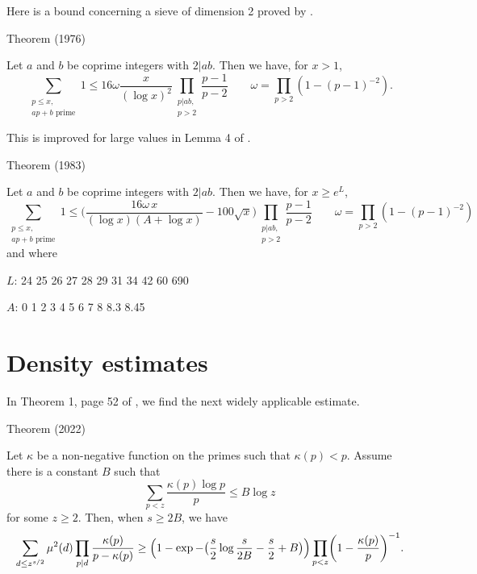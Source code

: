 \par 
Here is a bound concerning a sieve of dimension 2 proved by
\cite{Siebert*76}.
\par 
\begin{thm}{Theorem (1976)}

Let $a$ and $b$ be coprime integers with $2|ab$. Then we have, for $x>1$,
$$
\sum_{\substack{p\le x,\\ \text{$ap+b$ prime}}}1
\le 16 \omega\frac{x}{(\log x)^2}\prod_{\substack{p|ab,\\ p >
2}}\frac{p-1}{p-2}
\qquad \omega=\prod_{p > 2}(1-(p-1)^{-2}).
$$
\end{thm}


This is improved for large values in Lemma 4 of
\cite{Riesel-Vaughan*83}.
\par 
\begin{thm}{Theorem (1983)}

Let $a$ and $b$ be coprime integers with $2|ab$. Then we have, for $x
\ge e^L$,
$$
\sum_{\substack{p\le x,\\ \text{$ap+b$ prime}}}1
\le \biggl(\frac{16 \omega\, x}{(\log x)(A+\log x)}-100\sqrt{x}\biggr)\prod_{\substack{p|ab,\\ p >
2}}\frac{p-1}{p-2}
\qquad \omega=\prod_{p > 2}(1-(p-1)^{-2})
$$
and where

  
  
    
      $L$:
      24
      25
      26
      27
      28
      29
      31
      34
      42
      60
      690
    
    
      $A$:
      0
      1
      2
      3
      4
      5
      6
      7
      8
      8.3
      8.45
    
  
  
  
\end{thm}




\section{Density estimates }


In Theorem 1, page 52 of
\cite{Greaves*01},
we find the next widely applicable estimate.
\par 
\begin{thm}{Theorem (2022)}

    Let $\kappa$ be a non-negative function on the primes such that
    $\kappa(p) < p$. Assume there is a constant $B$ such that
		 $$
		 \sum_{p < z} \frac{\kappa(p)\log p}{p}
			   \le B\log z
			   $$
			   for some $z\ge 2$. Then, when $s\ge 2B$, we
			   have
			   $$
			   \sum_{d\le z^{s/2}}\mu^2(d)
			   \prod_{p|d}\frac{\kappa(p)}{p-\kappa(p)}
			   \ge
			   \Bigl(1-\exp-\bigl(\frac{s}{2}\log\frac{s}{2B}-\frac{s}{2}+B\bigr)\Bigr)
			   \prod_{p < z}\biggl(1-\frac{\kappa(p)}{p}\biggr)^{-1}.
			   $$
\end{thm}

